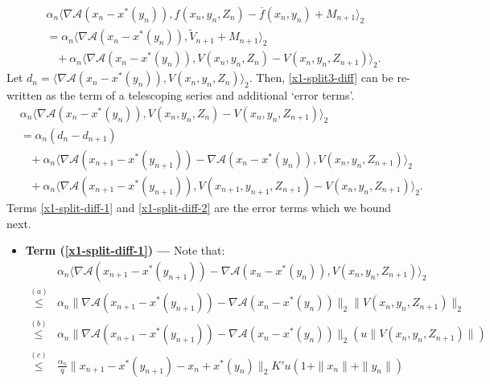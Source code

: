 \documentclass[letterpaper, 10 pt, conference]{ieeeconf}  %
\theoremstyle{definition}
\theoremstyle{plain}
\newcommand{\barf}{\overline{f}}
\newcommand{\xstar}{x^*}
\newcommand{\Acal}{\mathcal{A}}
\begin{document}
\begin{itemize}
\begin{subequations}\label{x1-split3-split}
    \begin{align}
        &\alpha_n\langle\nabla \Acal(x_n-\xstar(y_n)),f(x_n,y_n,Z_n)-\barf(x_n,y_n)+M_{n+1}\rangle_2\nonumber\\
        &=\alpha_n\langle\nabla \Acal(x_n-\xstar(y_n)),{\tilde{V}_{n+1}}+M_{n+1}\rangle_2\label{x1-split3-mart}\\
        &\;\;\;+\alpha_n\langle\nabla \Acal(x_n-\xstar(y_n)),V(x_n,y_n,Z_n)-V(x_n,y_n,Z_{n+1})\rangle_2\label{x1-split3-diff}.
    \end{align}
\end{subequations}
Let $d_n=\langle\nabla \Acal(x_n-\xstar(y_n)),V(x_n,y_n,Z_n)\rangle_2$. Then, \eqref{x1-split3-diff} can be re-written as the term of a telescoping series and additional `error terms'. 
\begin{subequations}\label{x1-split3-diff-soln}
    \begin{align}
        &\alpha_n\langle\nabla \Acal(x_n-\xstar(y_n)),V(x_n,y_n,Z_n)-V(x_n,y_n,Z_{n+1})\rangle_2\nonumber\\
        &=\alpha_n(d_n-d_{n+1})\label{tel-diff-d}\\
        &\;\;\;+\alpha_n\langle\nabla \Acal(x_{n+1}-\xstar(y_{n+1}))-\nabla \Acal(x_n-\xstar(y_n)), V(x_n,y_n,Z_{n+1})\rangle_2\label{x1-split-diff-1}\\
        &\;\;\;+\alpha_n\langle\nabla \Acal(x_{n+1}-\xstar(y_{n+1})), V(x_{n+1},y_{n+1},Z_{n+1})-V(x_n,y_n,Z_{n+1})\rangle_2\label{x1-split-diff-2}.
    \end{align}
\end{subequations}
Terms \eqref{x1-split-diff-1} and \eqref{x1-split-diff-2} are the error terms which we bound next.
\begin{itemize}
    \item \textbf{Term (\ref{x1-split-diff-1}) ---} Note that:
\begin{align*}
    &\alpha_n\langle\nabla \Acal(x_{n+1}-\xstar(y_{n+1}))-\nabla \Acal(x_n-\xstar(y_n)), V(x_n,y_n,Z_{n+1})\rangle_2\\
    \stackrel{(a)}{\leq} &\alpha_n\|\nabla \Acal(x_{n+1}-\xstar(y_{n+1}))-\nabla \Acal(x_n-\xstar(y_n))\|_2\|V(x_n,y_n,Z_{n+1})\|_2\\
    \stackrel{(b)}{\leq} &\alpha_n\|\nabla \Acal(x_{n+1}-\xstar(y_{n+1}))-\nabla \Acal(x_n-\xstar(y_n))\|_2\left(u\|V(x_n,y_n,Z_{n+1})\|\right)\\
    \stackrel{(c)}{\leq}  &\frac{\alpha_n}{q}\|x_{n+1}-\xstar(y_{n+1})-x_n+\xstar(y_n)\|_2K'u(1+\|x_n\|+\|y_n\|)\\

\end{align*}
\end{itemize}
\end{itemize}
\end{document}
